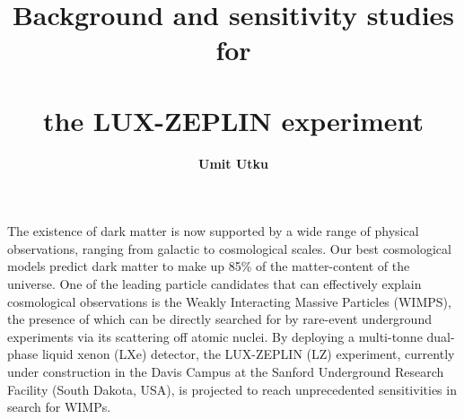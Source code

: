 
\title{Background and sensitivity studies for \\ \vspace{0.8cm} \\ the LUX-ZEPLIN experiment}
\author{\textbf{Umit Utku}}

\vspace*{-4.0cm}




\begin{abstract}
\end{abstract}
\bigskip
\vspace{-0.8cm}
The existence of dark matter is now supported by a wide range of physical observations, ranging from galactic to cosmological scales. Our best cosmological models predict dark matter to make up 85\% of the matter-content of the universe. One of the leading particle candidates that can effectively explain cosmological observations is the Weakly Interacting Massive Particles (WIMPS), the presence of which can be directly searched for by rare-event underground experiments via its scattering off atomic nuclei. By deploying a multi-tonne dual-phase liquid xenon (LXe) detector, the LUX-ZEPLIN (LZ) experiment, currently under construction in the Davis Campus at the Sanford Underground Research Facility (South Dakota, USA), is projected to reach unprecedented sensitivities in search for WIMPs.

